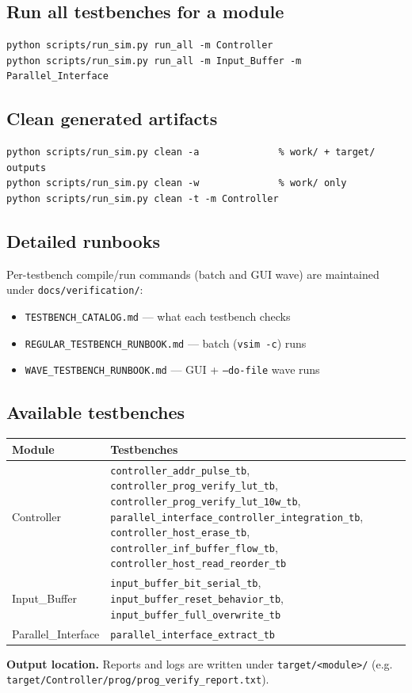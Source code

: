 \documentclass[11pt,a4paper]{article}
\begin{document}
\subsection{Run all testbenches for a module}
\begin{lstlisting}[style=shell]
python scripts/run_sim.py run_all -m Controller
python scripts/run_sim.py run_all -m Input_Buffer -m Parallel_Interface
\end{lstlisting}

\subsection{Clean generated artifacts}
\begin{lstlisting}[style=shell]
python scripts/run_sim.py clean -a              % work/ + target/ outputs
python scripts/run_sim.py clean -w              % work/ only
python scripts/run_sim.py clean -t -m Controller
\end{lstlisting}

\subsection{Detailed runbooks}
Per-testbench compile/run commands (batch and GUI wave) are maintained under
\texttt{docs/verification/}:
\begin{itemize}[leftmargin=1.4em]
  \item \texttt{TESTBENCH\_CATALOG.md} --- what each testbench checks
  \item \texttt{REGULAR\_TESTBENCH\_RUNBOOK.md} --- batch (\texttt{vsim -c}) runs
  \item \texttt{WAVE\_TESTBENCH\_RUNBOOK.md} --- GUI + \texttt{--do-file} wave runs
\end{itemize}

\subsection{Available testbenches}
\begin{longtable}{l Y}
\toprule
\textbf{Module} & \textbf{Testbenches} \\
\midrule
\endhead
Controller & \texttt{controller\_addr\_pulse\_tb},
             \texttt{controller\_prog\_verify\_lut\_tb},
             \texttt{controller\_prog\_verify\_lut\_10w\_tb},
             \texttt{parallel\_interface\_controller\_integration\_tb},
             \texttt{controller\_host\_erase\_tb},
             \texttt{controller\_inf\_buffer\_flow\_tb},
             \texttt{controller\_host\_read\_reorder\_tb} \\
\midrule
Input\_Buffer & \texttt{input\_buffer\_bit\_serial\_tb},
                \texttt{input\_buffer\_reset\_behavior\_tb},
                \texttt{input\_buffer\_full\_overwrite\_tb} \\
\midrule
Parallel\_Interface & \texttt{parallel\_interface\_extract\_tb} \\
\bottomrule
\end{longtable}

\vspace{1em}
\noindent\textbf{Output location.} Reports and logs are written under
\texttt{target/<module>/} (e.g.
\texttt{target/Controller/prog/prog\_verify\_report.txt}).
\end{document}
